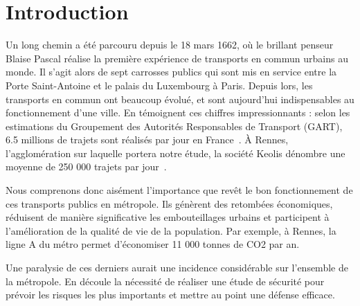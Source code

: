 \section{Introduction}
	Un long chemin a été parcouru depuis le 18 mars 1662, où le brillant penseur Blaise Pascal réalise la première expérience de transports en commun urbains au monde. Il s'agit alors de sept carrosses publics qui sont mis en service entre la Porte Saint-Antoine et le palais du Luxembourg à Paris. Depuis lors, les transports en commun ont beaucoup évolué, et sont aujourd'hui indispensables au fonctionnement d'une ville. En témoignent ces chiffres impressionnants : selon les estimations du Groupement des Autorités Responsables de Transport (GART), 6.5 millions de trajets sont réalisés par jour en France~\cite{Gart}. \`A Rennes, l'agglomération sur laquelle portera notre étude, la société Keolis dénombre une moyenne de 250 000 trajets par jour~\cite{Keolis}. 

	Nous comprenons donc aisément l'importance que revêt le bon fonctionnement de ces transports publics en métropole. Ils génèrent des retombées économiques, réduisent de manière significative les embouteillages urbains et participent à l’amélioration de la qualité de vie de la population. Par exemple, à Rennes, la ligne A du métro permet d'économiser 11 000 tonnes de CO2 par an. \cite{bilanLA}

	Une paralysie de ces derniers aurait une incidence considérable sur l'ensemble de la métropole. En découle la nécessité de réaliser une étude de sécurité pour prévoir les risques les plus importants et mettre au point une défense efficace. 

























